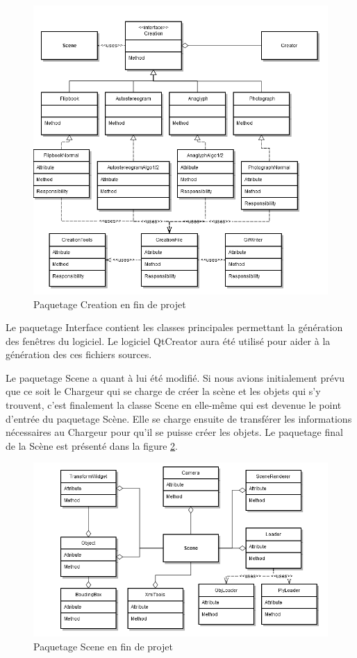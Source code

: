\begin{figure}[h]
		\centering
                \includegraphics[scale=0.5]{f_creation.png}
		\caption{\label{fig:creation} Paquetage Creation en fin de projet \protect \footnotemark}
\end{figure}


Le paquetage Interface contient les classes principales permettant la génération des fenêtres du logiciel. Le logiciel QtCreator aura été utilisé pour aider à la génération des ces fichiers sources.

Le paquetage Scene a quant à lui été modifié. Si nous avions initialement prévu que ce soit le Chargeur qui se charge de créer la scène et les objets qui s'y trouvent, c'est finalement la classe Scene en elle-même qui est devenue le point d'entrée du paquetage Scène. Elle se charge ensuite de transférer les informations nécessaires au Chargeur pour qu'il se puisse créer les objets. Le paquetage final de la Scène est présenté dans la figure \ref{fig:scene}.

\begin{figure}[h]
		\centering
                \includegraphics[scale=0.5]{f_scene.png}
		\caption{\label{fig:scene} Paquetage Scene en fin de projet \protect \footnotemark}
\end{figure}
